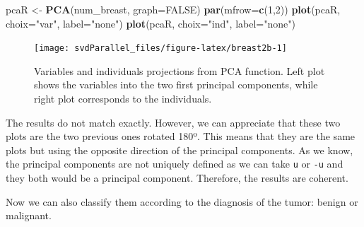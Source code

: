 \documentclass[]{article}
\newenvironment{Shaded}{\begin{snugshade}}{\end{snugshade}}
\newcommand{\KeywordTok}[1]{\textcolor[rgb]{0.13,0.29,0.53}{\textbf{#1}}}
\newcommand{\DataTypeTok}[1]{\textcolor[rgb]{0.13,0.29,0.53}{#1}}
\newcommand{\DecValTok}[1]{\textcolor[rgb]{0.00,0.00,0.81}{#1}}
\newcommand{\StringTok}[1]{\textcolor[rgb]{0.31,0.60,0.02}{#1}}
\newcommand{\OtherTok}[1]{\textcolor[rgb]{0.56,0.35,0.01}{#1}}
\newcommand{\NormalTok}[1]{#1}
\begin{document}
\begin{Shaded}
\begin{Highlighting}[]
\NormalTok{pcaR <-}\StringTok{ }\KeywordTok{PCA}\NormalTok{(num_breast, }\DataTypeTok{graph=}\OtherTok{FALSE}\NormalTok{)}
\KeywordTok{par}\NormalTok{(}\DataTypeTok{mfrow=}\KeywordTok{c}\NormalTok{(}\DecValTok{1}\NormalTok{,}\DecValTok{2}\NormalTok{))}
\KeywordTok{plot}\NormalTok{(pcaR, }\DataTypeTok{choix=}\StringTok{"var"}\NormalTok{, }\DataTypeTok{label=}\StringTok{"none"}\NormalTok{)}
\KeywordTok{plot}\NormalTok{(pcaR, }\DataTypeTok{choix=}\StringTok{"ind"}\NormalTok{, }\DataTypeTok{label=}\StringTok{"none"}\NormalTok{)}
\end{Highlighting}
\end{Shaded}

\begin{figure}

{\centering \texttt{[image: svdParallel\_files/figure-latex/breast2b-1]} 

}

\caption{Variables and individuals projections from PCA function. Left plot shows the variables into the two first principal components, while right plot corresponds to the individuals.}\label{fig:breast2b}
\end{figure}

The results do not match exactly. However, we can appreciate that these
two plots are the two previous ones rotated 180º. This means that they
are the same plots but using the opposite direction of the principal
components. As we know, the principal components are not uniquely
defined as we can take \texttt{u} or \texttt{-u} and they both would be
a principal component. Therefore, the results are coherent.

Now we can also classify them according to the diagnosis of the tumor:
benign or malignant.
\end{document}

